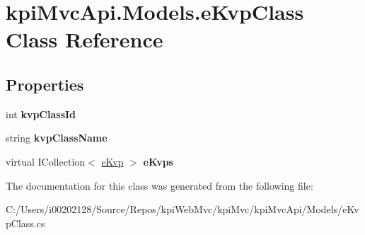 \hypertarget{classkpi_mvc_api_1_1_models_1_1e_kvp_class}{}\section{kpi\+Mvc\+Api.\+Models.\+e\+Kvp\+Class Class Reference}
\label{classkpi_mvc_api_1_1_models_1_1e_kvp_class}
\subsection*{Properties}
\begin{DoxyCompactItemize}
\item 
\mbox{\label{classkpi_mvc_api_1_1_models_1_1e_kvp_class_a00efa2fe5fe7eb4d9fef494217181d20}} 
int {\bfseries kvp\+Class\+Id}
\item 
\mbox{\label{classkpi_mvc_api_1_1_models_1_1e_kvp_class_a1218183b7a079a00329b12b5717f011a}} 
string {\bfseries kvp\+Class\+Name}
\item 
\mbox{\label{classkpi_mvc_api_1_1_models_1_1e_kvp_class_a7aed07b2d637e96579b62a40f77eb117}} 
virtual I\+Collection$<$ \hyperlink{classkpi_mvc_api_1_1_models_1_1e_kvp}{e\+Kvp} $>$ {\bfseries e\+Kvps}
\end{DoxyCompactItemize}


The documentation for this class was generated from the following file\+:\begin{DoxyCompactItemize}
\item 
C\+:/\+Users/i00202128/\+Source/\+Repos/kpi\+Web\+Mvc/kpi\+Mvc/kpi\+Mvc\+Api/\+Models/e\+Kvp\+Class.\+cs\end{DoxyCompactItemize}
